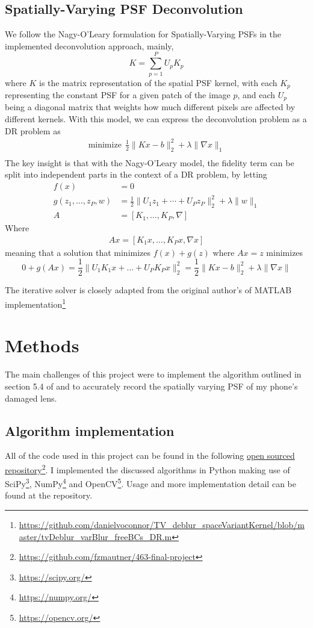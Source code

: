 \documentclass[sigconf]{acmart}
\begin{document}
\subsection{Spatially-Varying PSF Deconvolution}
We follow the Nagy-O'Leary \cite{nagyoleary} formulation for Spatially-Varying PSFs in the implemented deconvolution approach, mainly,
$$K = \sum_{p=1}^PU_pK_p$$
where $K$ is the matrix representation of the spatial PSF kernel, with each $K_p$ representing the constant PSF for a given patch of the image $p$, and each $U_p$ being a diagonal matrix that weights how much different pixels are affected by different kernels. With this model, we can express the deconvolution problem as a DR problem as
\begin{align*}
  \text{minimize}~~ \frac{1}{2}\|Kx - b\|_2^2 + \lambda\|\nabla x\|_1\\
\end{align*}
The key insight is that with the Nagy-O'Leary model, the fidelity term can be split into independent parts in the context of a DR problem, by letting
\begin{align*}
  f(x) &= 0\\
  g(z_1,\ldots,z_P, w) &= \frac{1}{2}\|U_1z_1 + \cdots + U_Pz_P\|_2^2 + \lambda\|w\|_1\\
  A &= [K_1, \ldots, K_P, \nabla]
\end{align*}
Where
\begin{align*}
  Ax = [K_1x, \ldots, K_Px, \nabla x]
\end{align*}
meaning that a solution that minimizes $f(x)+g(z)$ where $Ax = z$ minimizes 
$$0 + g(Ax) = \frac{1}{2}\|U_1K_1x + \ldots + U_PK_Px\|_2^2 = \frac{1}{2}\|Kx-b\|_2^2 + \lambda\|\nabla x\|$$

The iterative solver is closely adapted from the original author's of \cite{oconnor} MATLAB implementation\footnote{\url{https://github.com/danielvoconnor/TV_deblur_spaceVariantKernel/blob/master/tvDeblur_varBlur_freeBCs_DR.m}}

\section{Methods}
The main challenges of this project were to implement the algorithm outlined in section 5.4 of \cite{simplelens} and to accurately record the spatially varying PSF of my phone's damaged lens. 

\subsection{Algorithm implementation}
All of the code used in this project can be found in the following \href{https://github.com/fzmautner/463-final-project}{open sourced repository}\footnote{\url{https://github.com/fzmautner/463-final-project}}. I implemented the discussed algorithms in Python making use of SciPy\footnote{\url{https://scipy.org/}}, NumPy\footnote{\url{https://numpy.org/}} and OpenCV\footnote{\url{https://opencv.org/}}. Usage and more implementation detail can be found at the repository.
\end{document}
